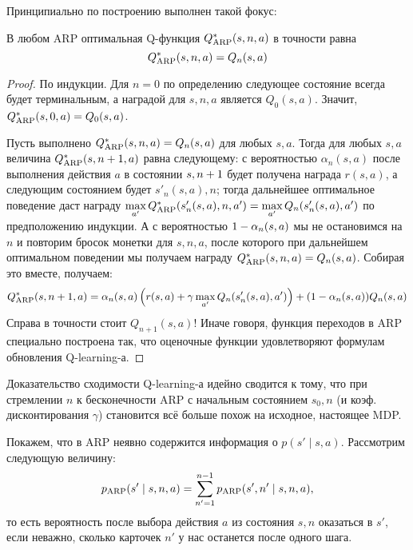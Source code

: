 Принципиально по построению выполнен такой фокус:
\begin{theorem}
В любом ARP оптимальная Q-функция $Q_{\mathrm{ARP}}^*(s, n, a)$ в точности равна
\begin{equation}\label{ARPQ}
Q_{\mathrm{ARP}}^*(s, n, a) = Q_n(s, a)
\end{equation}
\begin{proof}
По индукции. Для $n = 0$ по определению следующее состояние всегда будет терминальным, а наградой для $s, n, a$ является $Q_0(s, a)$. Значит, $Q_{\mathrm{ARP}}^*(s, 0, a) = Q_0(s, a)$.

Пусть выполнено $Q_{\ARP}^*(s, n, a) \HM= Q_n(s, a)$ для любых $s, a$. Тогда для любых $s, a$ величина $Q_{\ARP}^*(s, n \HM+ 1, a)$ равна следующему: с вероятностью $\alpha_n(s, a)$ после выполнения действия $a$ в состоянии $s, n \HM+ 1$ будет получена награда $r(s, a)$, а следующим состоянием будет $s'_n(s, a), n$; тогда дальнейшее оптимальное поведение даст награду $\max\limits_{a'} Q_{\ARP}^*(s'_n(s, a), n, a') \HM= \max\limits_{a'} Q_n(s'_n(s, a), a')$ по предположению индукции. А с вероятностью $1 \HM- \alpha_n(s, a)$ мы не остановимся на $n$ и повторим бросок монетки для $s, n, a$, после которого при дальнейшем оптимальном поведении мы получаем награду $Q^*_{\ARP}(s, n, a) \HM= Q_n(s, a)$. Собирая это вместе, получаем:
$$Q_{\mathrm{ARP}}^*(s, n + 1, a) = \alpha_n(s, a) \left( r(s, a) + \gamma \max_{a'} Q_n(s'_n(s, a), a') \right) + (1 - \alpha_n(s, a)) Q_n(s, a)$$
Справа в точности стоит $Q_{n+1}(s, a)$! Иначе говоря, функция переходов в ARP специально построена так, что оценочные функции удовлетворяют формулам обновления Q-learning-а.
\end{proof}
\end{theorem}

Доказательство сходимости Q-learning-а идейно сводится к тому, что при стремлении $n$ к бесконечности ARP с начальным состоянием $s_0, n$ (и коэф. дисконтирования $\gamma$) становится всё больше похож на исходное, настоящее MDP.

Покажем, что в ARP неявно содержится информация о $p(s' \mid s, a)$. Рассмотрим следующую величину:
$$p_{\mathrm{ARP}}(s' \mid s, n, a) = \sum_{n' = 1}^{n-1} p_{\mathrm{ARP}}(s', n' \mid s, n, a),$$
то есть вероятность после выбора действия $a$ из состояния $s, n$ оказаться в $s'$, если неважно, сколько карточек $n'$ у нас останется после одного шага.

